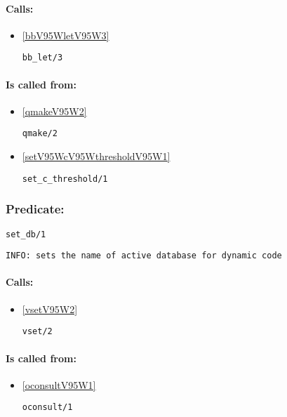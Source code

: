 \paragraph{Calls:} 
\begin{itemize}
\item \ref{bbV95WletV95W3} 
\begin{verbatim}
bb_let/3
\end{verbatim}

\end{itemize}
\paragraph{Is called from:} 
\begin{itemize}
\item \ref{qmakeV95W2} 
\begin{verbatim}
qmake/2
\end{verbatim}

\item \ref{setV95WcV95WthresholdV95W1} 
\begin{verbatim}
set_c_threshold/1
\end{verbatim}

\end{itemize}

\subsubsection{Predicate:} \label{setV95WdbV95W1}

\begin{verbatim}
set_db/1
\end{verbatim}

{\small \begin{verbatim}
INFO: sets the name of active database for dynamic code

\end{verbatim}}
\paragraph{Calls:} 
\begin{itemize}
\item \ref{vsetV95W2} 
\begin{verbatim}
vset/2
\end{verbatim}

\end{itemize}
\paragraph{Is called from:} 
\begin{itemize}
\item \ref{oconsultV95W1} 
\begin{verbatim}
oconsult/1
\end{verbatim}

\end{itemize}

